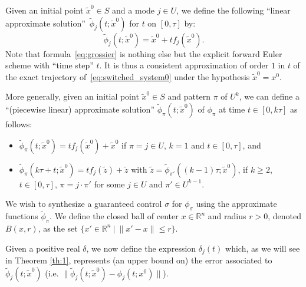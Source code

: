 Given an  initial point $\tilde{x}^0\in S$ and a mode $j\in U$, 
we define the following ``linear approximate 
solution''~$\tilde{\phi}_j(t;\tilde{x}^0)$ for $t$ on $[0,\tau]$ by:
\begin{equation}
\tilde{\phi}_j(t;\tilde{x}^0) = \tilde x^0 + t f_j(\tilde x^0).
\label{eq:grossier}
\end{equation}
\newline
\vspace{1em}
Note that formula~\eqref{eq:grossier} is nothing else but the explicit forward Euler scheme 
with ``time step'' $t$. It is thus a {consistent} approximation of order $1$ in $t$
of the exact trajectory of~\eqref{eq:switched_system0}
under the hypothesis $\tilde x^0=x^0$.

More generally, given an initial point $\tilde{x}^0\in S$ and  pattern $\pi$ of $U^k$,
we can define a ``(piecewise linear) approximate solution'' 
$\tilde{\phi}_\pi(t;\tilde{x}^0)$ of $\phi_\pi$ at time $t\in[0,k\tau]$ as follows:
\begin{itemize}
\item $\tilde{\phi}_\pi(t;\tilde{x}^0) = t f_j(\tilde{x}^0) + \tilde{x}^0$ if $\pi=j\in U$, $k=1$ and $t\in[0,\tau]$, and

\item $\tilde{\phi}_{\pi}(k\tau+t;\tilde{x}^0) = t f_j(\tilde{z}) + \tilde{z}$
with $\tilde{z}=\tilde{\phi}_{\pi'}((k-1)\tau;\tilde{x}^0)$, if $k\geq 2$, 
$t\in[0,\tau]$,
$\pi=j\cdot \pi'$ for some $j\in U$ and $\pi'\in U^{k-1}$.
\end{itemize}


We wish to synthesize a guaranteed control $\sigma$ for $\phi_{\sigma}$
using the approximate functions $\tilde{\phi}_\pi$.%
We define the closed ball of center $x\in\mathbb{R}^n$ and radius $r>0$, denoted $B(x,r)$, as the set $\{x'\in\mathbb{R}^n \ |\ \|x'-x\| \leq r\}$.

Given a positive real $\delta$, we now define the expression $\delta_j(t)$
which, as we will see in Theorem \ref{th:1}, represents (an upper bound on)
the error associated to $\tilde{\phi}_j(t; \tilde{x}^0)$
(i.e. $\|\tilde{\phi}_j(t; \tilde{x}^0)-\phi_j(t; x^0)\|$).

